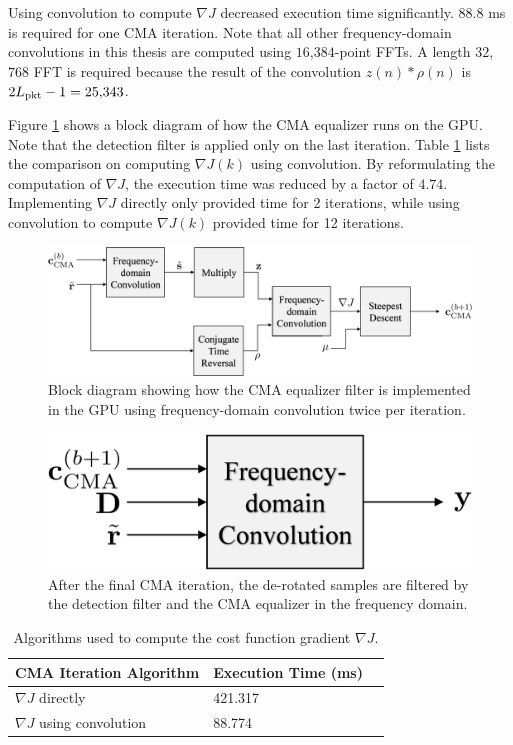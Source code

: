 Using convolution to compute $\nabla J$ decreased execution time significantly.
$88.8$ ms is required for one CMA iteration.
Note that all other frequency-domain convolutions in this thesis are computed using $16$,$384$-point FFTs.
A length $32$,$768$ FFT is required because the result of the convolution $z(n) * \rho(n)$ is $2L_\text{pkt}-1 = 25{,}343$.

Figure \ref{fig:blockCMA} shows a block diagram of how the CMA equalizer runs on the GPU.
Note that the detection filter is applied only on the last iteration.
Table \ref{tab:CMAtimingComparison} lists the comparison on computing $\nabla J(k)$ using convolution.
By reformulating the computation of $\nabla J$, the execution time was reduced by a factor of $4.74$.
Implementing $\nabla J$ directly only provided time for 2 iterations, while using convolution to compute $\nabla J(k)$ provided time for 12 iterations.
\begin{figure}
	\centering\includegraphics[width=10.66in/100*55]{figures/eq_GPUimplementation/blockCMA.pdf}
	\caption{Block diagram showing how the CMA equalizer filter is implemented in the GPU using frequency-domain convolution twice per iteration.}
	\label{fig:blockCMA}
\end{figure}
\begin{figure}
	\centering\includegraphics[width=3.95in/100*55]{figures/eq_GPUimplementation/blockCMA_apply.pdf}
	\caption{After the final CMA iteration, the de-rotated samples are filtered by the detection filter and the CMA equalizer in the frequency domain.}
	\label{fig:blockCMA_apply}
\end{figure}
\begin{table}
\captionsetup{width=.8\linewidth}
\caption{Algorithms used to compute the cost function gradient $\nabla J$.}
\begin{center}
\begin{tabular}{lll}
	\toprule
	CMA	Iteration Algorithm		& Execution Time (ms)	\\ \midrule
	$\nabla J$ directly 		& 421.317				\\
	$\nabla J$ using convolution & 88.774				\\
	\bottomrule
\end{tabular}
\end{center}
\label{tab:CMAtimingComparison}
\end{table}


